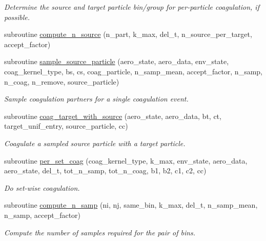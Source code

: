 \begin{DoxyCompactItemize}
\begin{DoxyCompactList}\small\item\em Determine the source and target particle bin/group for per-\/particle coagulation, if possible. \end{DoxyCompactList}\item 
subroutine \mbox{\hyperlink{namespacepmc__coagulation_a361de1ab6f07eedb1d66633ba50f3e49}{compute\+\_\+n\+\_\+source}} (n\+\_\+part, k\+\_\+max, del\+\_\+t, n\+\_\+source\+\_\+per\+\_\+target, accept\+\_\+factor)
\item 
subroutine \mbox{\hyperlink{namespacepmc__coagulation_a52dee0e42bb931daaa05f47cf32bf064}{sample\+\_\+source\+\_\+particle}} (aero\+\_\+state, aero\+\_\+data, env\+\_\+state, coag\+\_\+kernel\+\_\+type, bs, cs, coag\+\_\+particle, n\+\_\+samp\+\_\+mean, accept\+\_\+factor, n\+\_\+samp, n\+\_\+coag, n\+\_\+remove, source\+\_\+particle)
\begin{DoxyCompactList}\small\item\em Sample coagulation partners for a single coagulation event. \end{DoxyCompactList}\item 
subroutine \mbox{\hyperlink{namespacepmc__coagulation_a838d22172600c264f9f656ef20310a90}{coag\+\_\+target\+\_\+with\+\_\+source}} (aero\+\_\+state, aero\+\_\+data, bt, ct, target\+\_\+unif\+\_\+entry, source\+\_\+particle, cc)
\begin{DoxyCompactList}\small\item\em Coagulate a sampled source particle with a target particle. \end{DoxyCompactList}\item 
subroutine \mbox{\hyperlink{namespacepmc__coagulation_aa26bb6dffadf371d0be17adc22ea653a}{per\+\_\+set\+\_\+coag}} (coag\+\_\+kernel\+\_\+type, k\+\_\+max, env\+\_\+state, aero\+\_\+data, aero\+\_\+state, del\+\_\+t, tot\+\_\+n\+\_\+samp, tot\+\_\+n\+\_\+coag, b1, b2, c1, c2, cc)
\begin{DoxyCompactList}\small\item\em Do set-\/wise coagulation. \end{DoxyCompactList}\item 
subroutine \mbox{\hyperlink{namespacepmc__coagulation_a8df6a73ea4a7e7bedd8b12bf59420628}{compute\+\_\+n\+\_\+samp}} (ni, nj, same\+\_\+bin, k\+\_\+max, del\+\_\+t, n\+\_\+samp\+\_\+mean, n\+\_\+samp, accept\+\_\+factor)
\begin{DoxyCompactList}\small\item\em Compute the number of samples required for the pair of bins. \end{DoxyCompactList}\item 

\end{DoxyCompactItemize}
